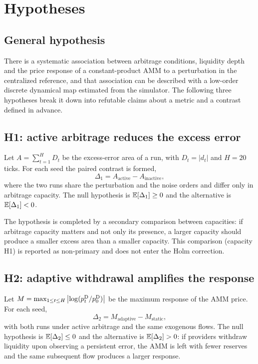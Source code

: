 \chapter{Hypotheses}
\label{cap:hipotesis}

\section{General hypothesis}

There is a systematic association between arbitrage conditions, liquidity depth and the price response of a constant-product AMM to a perturbation in the centralized reference, and that association can be described with a low-order discrete dynamical map estimated from the simulator. The following three hypotheses break it down into refutable claims about a metric and a contrast defined in advance.

\section{H1: active arbitrage reduces the excess error}

Let $A=\sum_{t=1}^{H} D_t$ be the excess-error area of a run, with $D_t=|d_t|$ and $H=20$ ticks. For each seed the paired contrast is formed,
\[
\Delta_1 = A_{\text{active}} - A_{\text{inactive}},
\]
where the two runs share the perturbation and the noise orders and differ only in arbitrage capacity. The null hypothesis is $\mathbb{E}[\Delta_1]\ge 0$ and the alternative is $\mathbb{E}[\Delta_1]<0$.

The hypothesis is completed by a secondary comparison between capacities: if arbitrage capacity matters and not only its presence, a larger capacity should produce a smaller excess area than a smaller capacity. This comparison (capacity H1) is reported as non-primary and does not enter the Holm correction.

\section{H2: adaptive withdrawal amplifies the response}

Let $M=\max_{1\le t\le H}\left|\log(p^{\mathrm{D}}_t/p^{\mathrm{D}}_0)\right|$ be the maximum response of the AMM price. For each seed,
\[
\Delta_2 = M_{\text{adaptive}} - M_{\text{static}},
\]
with both runs under active arbitrage and the same exogenous flows. The null hypothesis is $\mathbb{E}[\Delta_2]\le 0$ and the alternative is $\mathbb{E}[\Delta_2]>0$: if providers withdraw liquidity upon observing a persistent error, the AMM is left with fewer reserves and the same subsequent flow produces a larger response.


